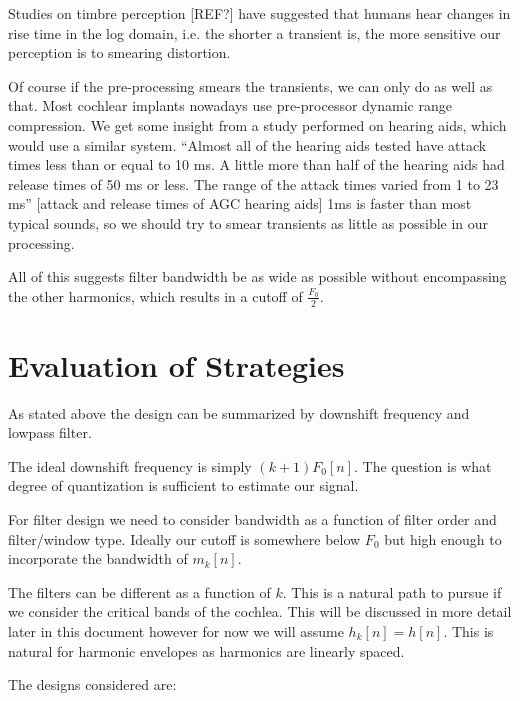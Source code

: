 \documentclass [11pt, proquest,oneside] {uwthesis}[2015/03/03]
\begin{document}
Studies on timbre perception [REF?] have suggested that humans hear changes in rise time in the log domain, i.e. the shorter a transient is, the more sensitive our perception is to smearing distortion.

Of course if the pre-processing smears the transients, we can only do as well as that.  Most cochlear implants nowadays use pre-processor dynamic range compression.  We get some insight from a study performed on hearing aids, which would use a similar system.  ``Almost all of the hearing aids tested have attack times less than or equal to 10 ms. A little more than half of the hearing aids had release times of 50 ms or less.  The range of the attack times varied from 1 to 23 ms'' [attack and release times of AGC hearing aids]  1ms is faster than most typical sounds, so we should try to smear transients as little as possible in our processing.

All of this suggests filter bandwidth be as wide as possible without encompassing the other harmonics, which results in a cutoff of $\frac{F_0}{2}$.



\section{Evaluation of Strategies}

As stated above the design can be summarized by downshift frequency and lowpass filter.

The ideal downshift frequency is simply $(k+1)F_0[n]$.  The question is what degree of quantization is sufficient to estimate our signal.

For filter design we need to consider bandwidth as a function of filter order and filter/window type.  Ideally our cutoff is somewhere below $F_0$ but high enough to incorporate the bandwidth of $m_k[n]$.

The filters can be different as a function of $k$.  This is a natural path to pursue if we consider the critical bands of the cochlea.  This will be discussed in more detail later in this document however for now we will assume $h_k[n] = h[n]$.  This is natural for harmonic envelopes as harmonics are linearly spaced.

The designs considered are:
\end{document}
